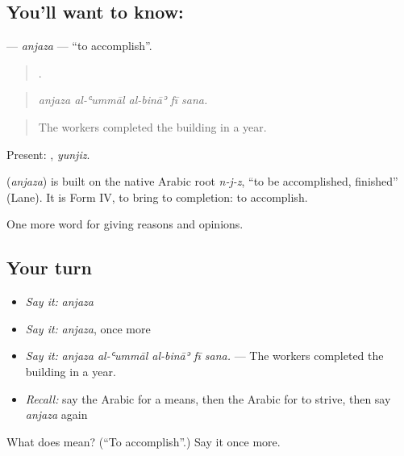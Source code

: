 \subsection*{You'll want to know: }
\textbf{} — \emph{anjaza} — \textquotedblleft{}to accomplish\textquotedblright{}.

\begin{quote}
    .
\end{quote}

\begin{quote}
\emph{anjaza al-ʿummāl al-bināʾ fī sana.}
\end{quote}

\begin{quote}
The workers completed the building in a year.
\end{quote}

Present: , \emph{yunjiz}.

\begin{cousinweb}
\textbf{} (\emph{anjaza}) is built on the native Arabic root \emph{n-j-z}, \textquotedblleft{}to be accomplished, finished\textquotedblright{} (Lane). It is Form IV, to bring to completion: to accomplish.
\end{cousinweb}

\begin{grammarlens}[title={What you've built}]
One more word for giving reasons and opinions.
\end{grammarlens}

\subsection*{Your turn}
\begin{itemize}
\raggedright
  \item \emph{Say it:} \emph{anjaza}
  \item \emph{Say it:} \emph{anjaza}, once more
  \item \emph{Say it:} \emph{anjaza al-ʿummāl al-bināʾ fī sana.} — The workers completed the building in a year.
  \item \emph{Recall:} say the Arabic for a means, then the Arabic for to strive, then say \emph{anjaza} again
\end{itemize}

\begin{tcolorbox}[breakable,colback=teal!4,colframe=teal!35!black,title={Before you move on}]
What does  mean? (\textquotedblleft{}To accomplish\textquotedblright{}.) Say it once more.
\end{tcolorbox}
